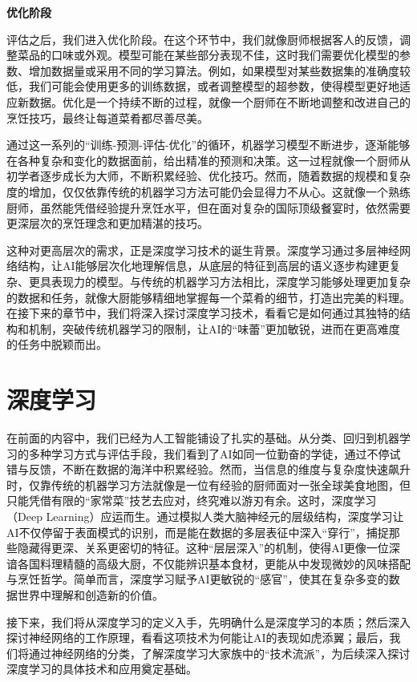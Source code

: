 \textbf{优化阶段}

评估之后，我们进入优化阶段。在这个环节中，我们就像厨师根据客人的反馈，调整菜品的口味或外观。模型可能在某些部分表现不佳，这时我们需要优化模型的参数、增加数据量或采用不同的学习算法。例如，如果模型对某些数据集的准确度较低，我们可能会使用更多的训练数据，或者调整模型的超参数，使得模型更好地适应新数据。优化是一个持续不断的过程，就像一个厨师在不断地调整和改进自己的烹饪技巧，最终让每道菜肴都尽善尽美。

通过这一系列的“训练-预测-评估-优化”的循环，机器学习模型不断进步，逐渐能够在各种复杂和变化的数据面前，给出精准的预测和决策。这一过程就像一个厨师从初学者逐步成长为大师，不断积累经验、优化技巧。然而，随着数据的规模和复杂度的增加，仅仅依靠传统的机器学习方法可能仍会显得力不从心。这就像一个熟练厨师，虽然能凭借经验提升烹饪水平，但在面对复杂的国际顶级餐宴时，依然需要更深层次的烹饪理念和更加精湛的技巧。

这种对更高层次的需求，正是深度学习技术的诞生背景。深度学习通过多层神经网络结构，让AI能够层次化地理解信息，从底层的特征到高层的语义逐步构建更复杂、更具表现力的模型。与传统的机器学习方法相比，深度学习能够处理更加复杂的数据和任务，就像大厨能够精细地掌握每一个菜肴的细节，打造出完美的料理。在接下来的章节中，我们将深入探讨深度学习技术，看看它是如何通过其独特的结构和机制，突破传统机器学习的限制，让AI的“味蕾”更加敏锐，进而在更高难度的任务中脱颖而出。

\section{深度学习}
在前面的内容中，我们已经为人工智能铺设了扎实的基础。从分类、回归到机器学习的多种学习方式与评估手段，我们看到了AI如同一位勤奋的学徒，通过不停试错与反馈，不断在数据的海洋中积累经验。然而，当信息的维度与复杂度快速飙升时，仅靠传统的机器学习方法就像是一位有经验的厨师面对一张全球美食地图，但只能凭借有限的“家常菜”技艺去应对，终究难以游刃有余。这时，深度学习（Deep Learning）应运而生。通过模拟人类大脑神经元的层级结构，深度学习让AI不仅停留于表面模式的识别，而是能在数据的多层表征中深入“穿行”，捕捉那些隐藏得更深、关系更密切的特征。这种“层层深入”的机制，使得AI更像一位深谙各国料理精髓的高级大厨，不仅能辨识基本食材，更能从中发现微妙的风味搭配与烹饪哲学。简单而言，深度学习赋予AI更敏锐的“感官”，使其在复杂多变的数据世界中理解和创造新的价值。

接下来，我们将从深度学习的定义入手，先明确什么是深度学习的本质；然后深入探讨神经网络的工作原理，看看这项技术为何能让AI的表现如虎添翼；最后，我们将通过神经网络的分类，了解深度学习大家族中的“技术流派”，为后续深入探讨深度学习的具体技术和应用奠定基础。

